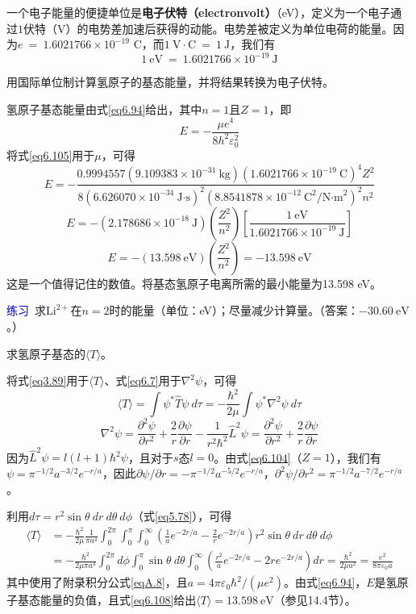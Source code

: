 \documentclass[12pt,a4paper,openany]{ctexbook}
\begin{document}
\begin{flushleft}
一个电子能量的便捷单位是\textbf{电子伏特（electronvolt）}（eV），定义为一个电子通过$1$伏特（V）的电势差加速后获得的动能。电势差被定义为单位电荷的能量。因为$e\ =\ 1.6021766 \times 10^{-19}$ C，而$1\ \text{V}\cdot \text{C}\ =\ 1\ \text{J}$，我们有
\begin{equation}
    1\ \text{eV}\ =\ 1.6021766 \times 10^{-19}\ \text{J} \label{eq6.107}
\end{equation}

\begin{examplebox}
    \setlength{\parindent}{2em}
    用国际单位制计算氢原子的基态能量，并将结果转换为电子伏特。

    氢原子基态能量由式\eqref{eq6.94}给出，其中$n=1$且$Z=1$，即
    \[
    E = -\frac{\mu e^4}{8h^2\varepsilon_0^2}
    \]
    将式\eqref{eq6.105}用于$\mu$，可得
    \[
    E = -\frac{0.9994557(9.109383 \times 10^{-31}\ \text{kg})(1.6021766 \times 10^{-19}\ \text{C})^4 Z^2}{8(6.626070 \times 10^{-34}\ \text{J·s})^2(8.8541878 \times 10^{-12}\ \text{C}^2/\text{N·m}^2)^2 n^2}
    \]
    \[
    E = -(2.178686 \times 10^{-18}\ \text{J})\left(\frac{Z^2}{n^2}\right)\left[\frac{1\ \text{eV}}{1.6021766 \times 10^{-19}\ \text{J}}\right]
    \]
    \[
    E = -(13.598\ \text{eV})\left(\frac{Z^2}{n^2}\right) = -13.598\ \text{eV} \tag{6.108}
    \]
    这是一个值得记住的数值。将基态氢原子电离所需的最小能量为13.598 eV。

    \textcolor{blue}{\large 练习}\ 求$\text{Li}^{2+}$在$n=2$时的能量（单位：eV）；尽量减少计算量。（答案：$-30.60\ \text{eV}$。）
\end{examplebox}
\begin{examplebox}
    求氢原子基态的$\langle T \rangle$。

将式\eqref{eq3.89}用于$\langle T \rangle$、式\eqref{eq6.7}用于$\nabla^2\psi$，可得
\[
\langle T \rangle = \int \psi^* \hat{T}\psi\ d\tau = -\frac{\hbar^2}{2\mu} \int \psi^* \nabla^2\psi\ d\tau
\]
\[
\nabla^2\psi = \frac{\partial^2\psi}{\partial r^2} + \frac{2}{r}\frac{\partial\psi}{\partial r} - \frac{1}{r^2\hbar^2}\hat{L}^2\psi = \frac{\partial^2\psi}{\partial r^2} + \frac{2}{r}\frac{\partial\psi}{\partial r}
\]
因为$\hat{L}^2\psi = l(l+1)\hbar^2\psi$，且对于$s$态$l=0$。由式\eqref{eq6.104}（$Z=1$），我们有$\psi = \pi^{-1/2}a^{-3/2}e^{-r/a}$，因此$\partial\psi/\partial r = -\pi^{-1/2}a^{-5/2}e^{-r/a}$，$\partial^2\psi/\partial r^2 = \pi^{-1/2}a^{-7/2}e^{-r/a}$。

利用$d\tau = r^2\sin\theta\ dr\ d\theta\ d\phi$（式\eqref{eq5.78}），可得
\[
\begin{aligned}
\langle T \rangle &= -\frac{\hbar^2}{2\mu} \frac{1}{\pi a^4} \int_0^{2\pi}  \int_0^\pi \int_0^\infty \left(\frac{1}{a}e^{-2r/a} - \frac{2}{r}e^{-2r/a}\right) r^2 \sin\theta\ dr\ d\theta\ d\phi \\
&= -\frac{\hbar^2}{2\mu\pi a^4} \int_0^{2\pi} d\phi \int_0^\pi \sin\theta\ d\theta \int_0^\infty \left(\frac{r^2}{a}e^{-2r/a} - 2re^{-2r/a}\right) dr = \frac{\hbar^2}{2\mu a^2} = \frac{e^2}{8\pi\varepsilon_0 a}
\end{aligned}
\]
其中使用了附录积分公式\eqref{eqA.8}，且$a = 4\pi\varepsilon_0\hbar^2/(\mu e^2)$。由式\eqref{eq6.94}，$E$是氢原子基态能量的负值，且式\eqref{eq6.108}给出$\langle T \rangle = 13.598\ \text{eV}$（参见14.4节）。


\end{examplebox}
\end{flushleft}
\end{document}
